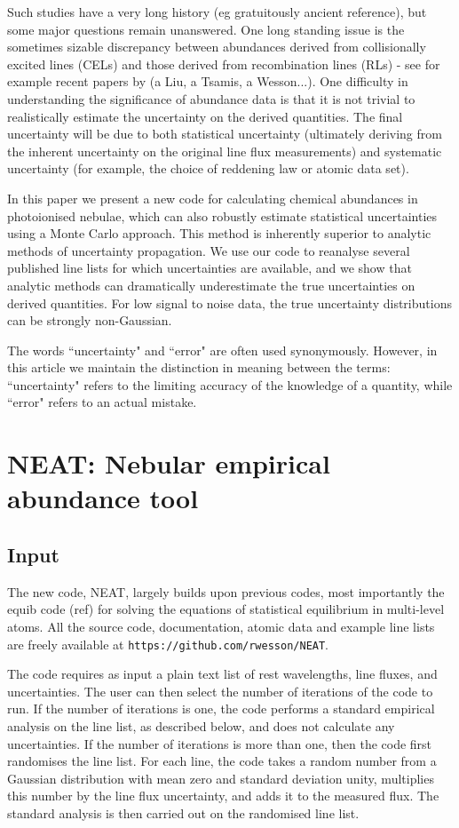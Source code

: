 \documentclass[useAMS,usenatbib]{mn2e}
\begin{document}
Such studies have a very long history (eg gratuitously ancient reference), but some major questions remain unanswered.  One long standing issue is the sometimes sizable discrepancy between abundances derived from collisionally excited lines (CELs) and those derived from recombination lines (RLs) - see for example recent papers by (a Liu, a Tsamis, a Wesson...).  One difficulty in understanding the significance of abundance data is that it is not trivial to realistically estimate the uncertainty on the derived quantities.  The final uncertainty will be due to both statistical uncertainty (ultimately deriving from the inherent uncertainty on the original line flux measurements) and systematic uncertainty (for example, the choice of reddening law or atomic data set).

In this paper we present a new code for calculating chemical abundances in photoionised nebulae, which can also robustly estimate statistical uncertainties using a Monte Carlo approach.  This method is inherently superior to analytic methods of uncertainty propagation.  We use our code to reanalyse several published line lists for which uncertainties are available, and we show that analytic methods can dramatically underestimate the true uncertainties on derived quantities.  For low signal to noise data, the true uncertainty distributions can be strongly non-Gaussian.

The words ``uncertainty" and ``error" are often used synonymously.  However, in this article we maintain the distinction in meaning between the terms: ``uncertainty" refers to the limiting accuracy of the knowledge of a quantity, while ``error" refers to an actual mistake.

\section{NEAT: Nebular empirical abundance tool}

\subsection{Input}

The new code, NEAT, largely builds upon previous codes, most importantly the {\sc equib} code (ref) for solving the equations of statistical equilibrium in multi-level atoms.  All the source code, documentation, atomic data and example line lists are freely available at \texttt{https://github.com/rwesson/NEAT}.

The code requires as input a plain text list of rest wavelengths, line fluxes, and uncertainties.  The user can then select the number of iterations of the code to run.  If the number of iterations is one, the code performs a standard empirical analysis on the line list, as described below, and does not calculate any uncertainties.  If the number of iterations is more than one, then the code first randomises the line list.  For each line, the code takes a random number from a Gaussian distribution with mean zero and standard deviation unity, multiplies this number by the line flux uncertainty, and adds it to the measured flux.  The standard analysis is then carried out on the randomised line list.
\end{document}
